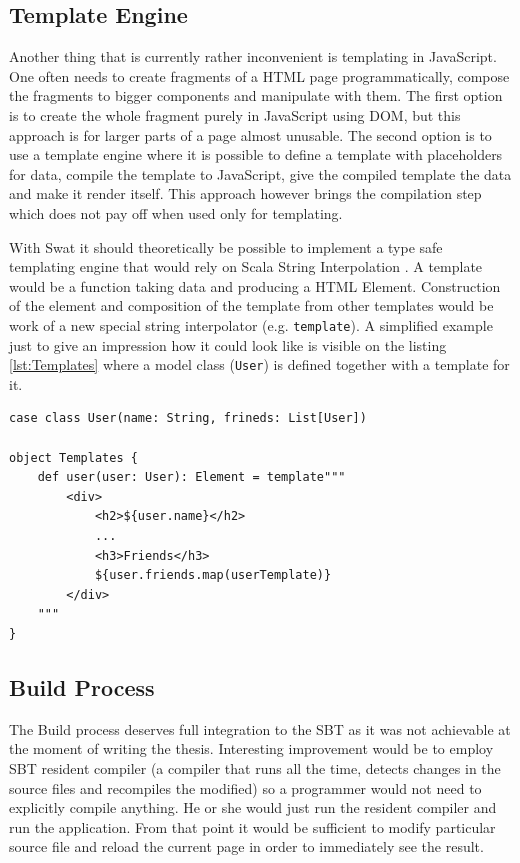 \documentclass[12pt,a4paper]{report}
\begin{document}
\subsection{Template Engine}

Another thing that is currently rather inconvenient is templating in JavaScript. One often needs to create fragments of a HTML page programmatically, compose the fragments to bigger components and manipulate with them. The first option is to create the whole fragment purely in JavaScript using DOM, but this approach is for larger parts of a page almost unusable. The second option is to use a template engine where it is possible to define a template with placeholders for data, compile the template to JavaScript, give the compiled template the data and make it render itself. This approach however brings the compilation step which does not pay off when used only for templating.

With Swat it should theoretically be possible to implement a type safe templating engine that would rely on Scala String Interpolation \cite{StringInterpolation}. A template would be a function taking data and producing a HTML Element. Construction of the element and composition of the template from other templates would be work of a new special string interpolator (e.g. \texttt{template}). A simplified example just to give an impression how it could look like is visible on the listing \ref{lst:Templates} where a model class (\texttt{User}) is defined together with a template for it.

\begin{lstlisting}[caption={Templating engine example.},label={lst:Templates}]
case class User(name: String, frineds: List[User])

object Templates {
    def user(user: User): Element = template"""
        <div>
            <h2>${user.name}</h2>
            ...
            <h3>Friends</h3>
            ${user.friends.map(userTemplate)}
        </div>
    """
}
\end{lstlisting}

\subsection{Build Process}

The Build process deserves full integration to the SBT as it was not achievable at the moment of writing the thesis. Interesting improvement would be to employ SBT resident compiler (a compiler that runs all the time, detects changes in the source files and recompiles the modified) so a programmer would not need to explicitly compile anything. He or she would just run the resident compiler and run the application. From that point it would be sufficient to modify particular source file and reload the current page in order to immediately see the result.
\end{document}

